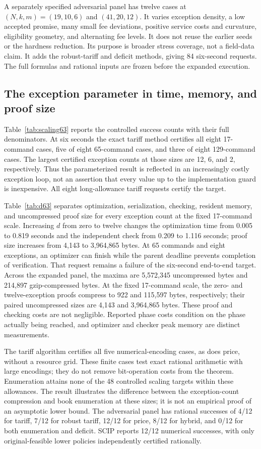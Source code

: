 A separately specified adversarial panel has twelve cases at $(N,k,m)=(19,10,6)$ and $(41,20,12)$. It varies exception density, a low accepted promise, many small fee deviations, positive service costs and curvature, eligibility geometry, and alternating fee levels. It does not reuse the earlier seeds or the hardness reduction. Its purpose is broader stress coverage, not a field-data claim. It adds the robust-tariff and deficit methods, giving 84 six-second requests. The full formulas and rational inputs are frozen before the expanded execution.

\subsection{The exception parameter in time, memory, and proof size}
Table~\ref{tab:scaling63} reports the controlled success counts with their full denominators. At six seconds the exact tariff method certifies all eight 17-command cases, five of eight 65-command cases, and three of eight 129-command cases. The largest certified exception counts at those sizes are 12, 6, and 2, respectively. Thus the parameterized result is reflected in an increasingly costly exception loop, not an assertion that every value up to the implementation guard is inexpensive. All eight long-allowance tariff requests certify the target.

Table~\ref{tab:d63} separates optimization, serialization, checking, resident memory, and uncompressed proof size for every exception count at the fixed 17-command scale. Increasing $d$ from zero to twelve changes the optimization time from 0.005 to 0.819 seconds and the independent check from 0.209 to 1.116 seconds; proof size increases from 4,143 to 3,964,865 bytes. At 65 commands and eight exceptions, an optimizer can finish while the parent deadline prevents completion of verification. That request remains a failure of the six-second end-to-end target. Across the expanded panel, the maxima are 5,572,345 uncompressed bytes and 214,897 gzip-compressed bytes. At the fixed 17-command scale, the zero- and twelve-exception proofs compress to 922 and 115,597 bytes, respectively; their paired uncompressed sizes are 4,143 and 3,964,865 bytes. These proof and checking costs are not negligible. Reported phase costs condition on the phase actually being reached, and optimizer and checker peak memory are distinct measurements.

The tariff algorithm certifies all five numerical-encoding cases, as does price, without a resource grid. These finite cases test exact rational arithmetic with large encodings; they do not remove bit-operation costs from the theorem. Enumeration attains none of the 48 controlled scaling targets within these allowances. The result illustrates the difference between the exception-count compression and book enumeration at these sizes; it is not an empirical proof of an asymptotic lower bound. The adversarial panel has rational successes of 4/12 for tariff, 7/12 for robust tariff, 12/12 for price, 8/12 for hybrid, and 0/12 for both enumeration and deficit. SCIP reports 12/12 numerical successes, with only original-feasible lower policies independently certified rationally.

